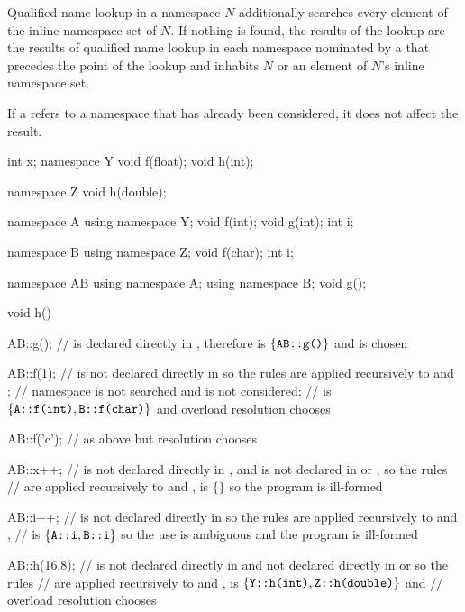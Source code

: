 \pnum
Qualified name lookup in a namespace $N$ additionally searches
every element of the inline namespace set of $N$.
If nothing is found,
the results of the lookup are the results of qualified name lookup
in each namespace nominated by a 
that precedes the point of the lookup and
inhabits $N$ or an element of $N$'s inline namespace set.
\begin{note}
If a  refers to a namespace
that has already been considered, it does not affect the result.
\end{note}
\begin{example}
\begin{codeblock}
int x;
namespace Y {
  void f(float);
  void h(int);
}

namespace Z {
  void h(double);
}

namespace A {
  using namespace Y;
  void f(int);
  void g(int);
  int i;
}

namespace B {
  using namespace Z;
  void f(char);
  int i;
}

namespace AB {
  using namespace A;
  using namespace B;
  void g();
}

void h()
{
  AB::g();          //  is declared directly in , therefore  is $\{ \texttt{\protect AB::g()} \}$ and  is chosen

  AB::f(1);         //  is not declared directly in  so the rules are applied recursively to  and ;
                    // namespace  is not searched and  is not considered;
                    //  is $\{ \texttt{\protect A::f(int)}, \texttt{\protect B::f(char)} \}$ and overload resolution chooses 

  AB::f('c');       // as above but resolution chooses 

  AB::x++;          //  is not declared directly in , and is not declared in  or , so the rules
                    // are applied recursively to  and ,  is $\{ \}$ so the program is ill-formed

  AB::i++;          //  is not declared directly in  so the rules are applied recursively to  and ,
                    //  is $\{ \texttt{\protect A::i}, \texttt{\protect B::i} \}$ so the use is ambiguous and the program is ill-formed

  AB::h(16.8);      //  is not declared directly in  and not declared directly in  or  so the rules
                    // are applied recursively to  and ,  is $\{ \texttt{\protect Y::h(int)}, \texttt{\protect Z::h(double)} \}$ and
                    // overload resolution chooses 
}
\end{codeblock}
\end{example}

